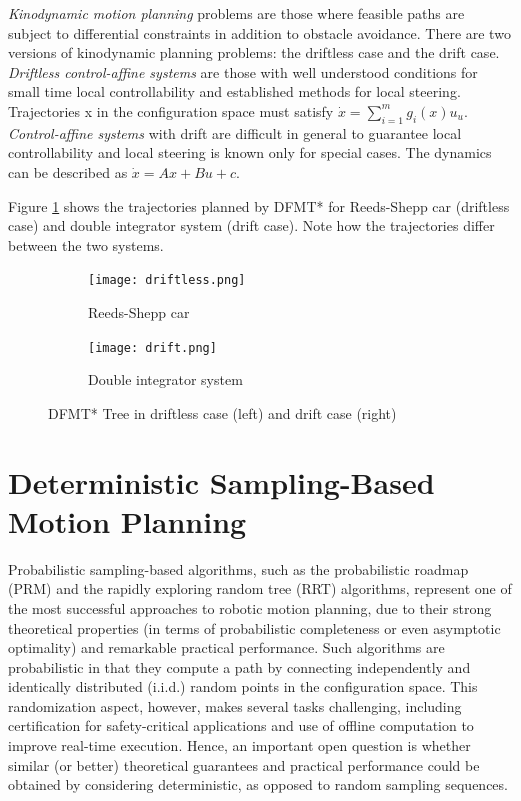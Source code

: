 \documentclass[twoside]{article}
\begin{document}
\textit{Kinodynamic motion planning} problems are those where feasible paths are subject to differential constraints in addition to obstacle avoidance. There are two versions of kinodynamic planning problems: the driftless case and the drift case. \textit{Driftless control-affine systems} are those with well understood conditions for small time local controllability and established methods for local steering. Trajectories x in the configuration space must satisfy $\dot{x} = \sum_{i=1}^{m}g_i(x)u_u$. \textit{Control-affine systems} with drift are difficult in general to guarantee local controllability and local steering is known only for special cases. The dynamics can be described as $\dot{x} = Ax + Bu + c$.

Figure \ref{fig:kino} shows the trajectories planned by DFMT* for Reeds-Shepp car (driftless case) and double integrator system (drift case). Note how the trajectories differ between the two systems.

\begin{figure}[H]
    \centering
    \begin{subfigure}[b]{0.4\linewidth}
      \texttt{[image: driftless.png]}
      \caption{Reeds-Shepp car}
    \end{subfigure}
    \begin{subfigure}[b]{0.4\linewidth}
      \texttt{[image: drift.png]}
      \caption{Double integrator system}
    \end{subfigure}
    \caption{DFMT* Tree in driftless case (left) and drift case (right)}
    \label{fig:kino}
  \end{figure}


\section{Deterministic Sampling-Based Motion Planning} %

Probabilistic sampling-based algorithms, such as the probabilistic roadmap (PRM) and the rapidly exploring random tree (RRT) algorithms, represent one of the most successful approaches to robotic motion planning, due to their strong theoretical properties (in terms of probabilistic completeness or even asymptotic optimality) and remarkable practical performance. Such algorithms are probabilistic in that they compute a path by connecting independently and identically distributed (i.i.d.) random points in the configuration space. This randomization aspect, however, makes several tasks challenging, including certification for safety-critical applications and use of offline computation to improve real-time execution. Hence, an important open question is whether similar (or better) theoretical guarantees and practical performance could be obtained by considering deterministic, as opposed to random sampling sequences.
\end{document}
